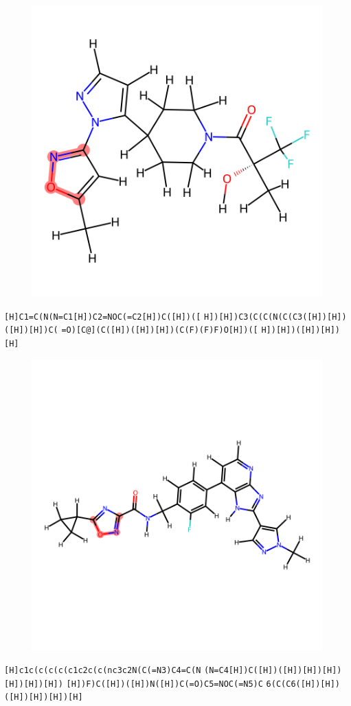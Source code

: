 \documentclass{article}
\begin{document}
\begin{figure}[ht]
\centering
    \includegraphics{mol48.png}
\end{figure}
\verb|[H]C1=C(N(N=C1[H])C2=NOC(=C2[H])C([H])([| \verb|H])[H])C3(C(C(N(C(C3([H])[H])([H])[H])C(| \verb|=O)[C@](C([H])([H])[H])(C(F)(F)F)O[H])([| \verb|H])[H])([H])[H])[H]|

\begin{figure}[ht]
\centering
    \includegraphics{mol49.png}
\end{figure}
\verb|[H]c1c(c(c(c(c1c2c(c(nc3c2N(C(=N3)C4=C(N| \verb|(N=C4[H])C([H])([H])[H])[H])[H])[H])[H])| \verb|[H])F)C([H])([H])N([H])C(=O)C5=NOC(=N5)C| \verb|6(C(C6([H])[H])([H])[H])[H])[H]|
\end{document}
